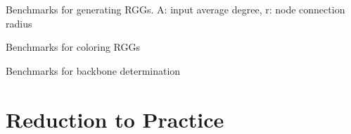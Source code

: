 \documentclass{article}
\begin{document}
    \begin{center}
        \begin{table}[h]
            \centering
            \begin{adjustbox}{width=1\textwidth}
            \end{adjustbox}
            \caption{Benchmarks for generating RGGs. A: input average degree, r: node connection radius}
            \label{tab1}
        \end{table}
    \end{center}

    \begin{center}
        \begin{table}[h]
            \centering
            \caption{Benchmarks for coloring RGGs}
            \label{tab2}
        \end{table}
    \end{center}

    \begin{center}
        \begin{table}[h!]
            \centering
            \begin{adjustbox}{width=1\textwidth}
            \end{adjustbox}
            \caption{Benchmarks for backbone determination}
            \label{tab3}
        \end{table}
    \end{center}

\section{Reduction to Practice}
\end{document}
